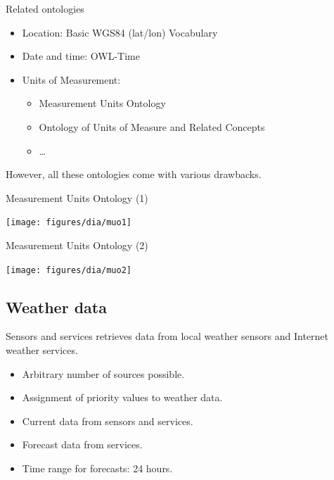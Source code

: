 \documentclass{beamer}
\begin{document}
\begin{frame}{Related ontologies}
	\begin{itemize}
		\item Location: Basic WGS84 (lat/lon) Vocabulary
		\item Date and time: OWL-Time
		\item Units of Measurement:
			\begin{itemize}
				\item Measurement Units Ontology
				\item Ontology of Units of Measure and Related Concepts
				\item …
			\end{itemize}
	\end{itemize}
	\vspace{1em}
	However, all these ontologies come with various drawbacks.
\end{frame}

\begin{frame}{Measurement Units Ontology (1)}
	\begin{center}
		\texttt{[image: figures/dia/muo1]}
	\end{center}
\end{frame}

\begin{frame}{Measurement Units Ontology (2)}
	\begin{center}
		\texttt{[image: figures/dia/muo2]}
	\end{center}
\end{frame}

\subsection{Weather data}

\begin{frame}{Sensors and services}
	\smarthomeweather retrieves data from local weather sensors and Internet weather services.

	\begin{itemize}
		\item Arbitrary number of sources possible.
		\item Assignment of priority values to weather data.
		\item Current data from sensors and services.
		\item Forecast data from services.
		\item Time range for forecasts: 24 hours.
	\end{itemize}
\end{frame}
\end{document}
